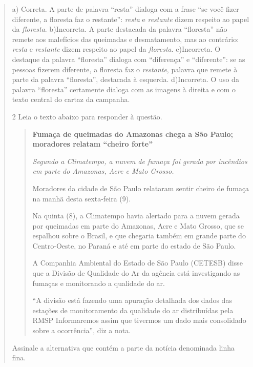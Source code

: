 \begin{quote}
{a) Correta. A parte de palavra ``resta'' dialoga com a frase ``se você fizer diferente, a floresta faz o
restante'': \textit{resta} e \textit{restante} dizem respeito ao papel da \textit{floresta}.     
b)Incorreta. A parte destacada da palavra ``floresta'' não remete aos malefícios das queimadas e desmatamento, 
mas ao contrário: \textit{resta} e \textit{restante} dizem respeito ao papel da \textit{floresta}. 
c)Incorreta. O destaque da palavra ``floresta'' dialoga com ``diferença'' e ``diferente'': se as pessoas fizerem
diferente, a floresta faz o \textit{restante}, palavra que remete à parte da palavra ``floresta'', destacada 
à esquerda. 
d)Incorreta. O uso da palavra ``floresta'' certamente dialoga com as imagens à direita e com o texto central do cartaz da campanha.}

\num{2} Leia o texto abaixo para responder à questão. 

\begin{quote}
\textbf{Fumaça de queimadas do Amazonas chega a São Paulo; moradores
relatam ``cheiro forte''}

\textit{Segundo a Climatempo, a nuvem de fumaça foi gerada por incêndios em
parte do Amazonas, Acre e Mato Grosso.}

Moradores da cidade de São Paulo relataram sentir cheiro de fumaça na
manhã desta sexta-feira (9).

Na quinta (8), a Climatempo havia alertado para a nuvem gerada por
queimadas em parte do Amazonas, Acre e Mato Grosso, que se espalhou sobre o
Brasil, e que chegaria também em grande parte do Centro-Oeste, no Paraná
e até em parte do estado de São Paulo.

A Companhia Ambiental do Estado de São Paulo (CETESB) disse que a
Divisão de Qualidade do Ar da agência está investigando as fumaças e
monitorando a qualidade do ar.

``A divisão está fazendo uma apuração detalhada dos dados das
estações de monitoramento da qualidade do ar distribuídas pela RMSP
Informaremos assim que tivermos um dado mais consolidado sobre a
ocorrência'', diz a nota.
\end{quote}


Assinale a alternativa que contém a parte da notícia denominada linha fina.


\end{quote}
